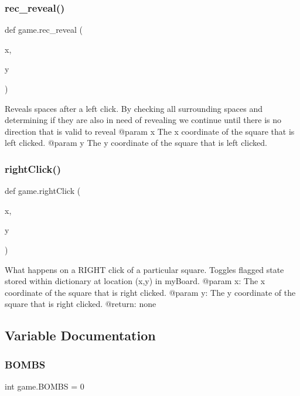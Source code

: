 \subsubsection{\texorpdfstring{rec\_reveal()}{rec\_reveal()}}
{\footnotesize\ttfamily def game.\+rec\+\_\+reveal (\begin{DoxyParamCaption}\item[{}]{x,  }\item[{}]{y }\end{DoxyParamCaption})}

\begin{DoxyVerb}Reveals spaces after a left click. By checking all
surrounding spaces and determining if they are also
in need of revealing we continue until there is no
direction that is valid to reveal
@param x The x coordinate of the square that is left clicked.
@param y The y coordinate of the square that is left clicked.
\end{DoxyVerb}
 \mbox{\label{namespacegame_a004c6f8ef3349c23a158399780ec85be}} 
\subsubsection{\texorpdfstring{rightClick()}{rightClick()}}
{\footnotesize\ttfamily def game.\+right\+Click (\begin{DoxyParamCaption}\item[{}]{x,  }\item[{}]{y }\end{DoxyParamCaption})}

\begin{DoxyVerb}What happens on a RIGHT click of a particular square. Toggles flagged state stored within dictionary at location (x,y)
in myBoard.
@param x: The x coordinate of the square that is right clicked.
@param y: The y coordinate of the square that is right clicked.
@return: none
\end{DoxyVerb}
 

\subsection{Variable Documentation}
\mbox{\label{namespacegame_a3eb01cc0a7bb0f38c53f6d096a912956}} 
\subsubsection{\texorpdfstring{BOMBS}{BOMBS}}
{\footnotesize\ttfamily int game.\+B\+O\+M\+BS = 0}

